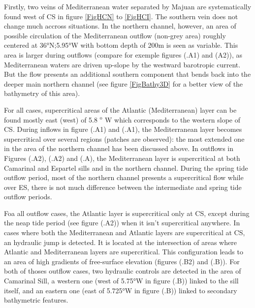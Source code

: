 Firstly, two veins of Mediterranean water separated by Majuan are systematically found west of CS in figure \ref{FigHCN} to \ref{FigHCI}.
The southern vein does not change much accross situations. In the northern channel, however, an area of possible circulation of the Mediterranean outflow (non-grey area) roughly centered at 36°N;5.95°W with bottom depth of 200m is seen as variable. This area is larger during outflows (compare for exemple figures (.A1) and (A2)), as Mediterranean waters are driven up-slope by the westward barotropic current. But the flow presents an additional southern component that bends back into the deeper main northern channel (see figure \ref{FigBathy3D} for a better view of the bathymetry of this area).

For all cases, supercritical areas of the Atlantic (Mediterranean) layer can be found mostly east (west) of 5.8 $^\text{o}$ W which corresponds to the western slope of CS. During inflows in figure (.A1) and (.A1), the Mediterranean layer becomes supercritical over several regions (patches are observed): the most extended one in the area of the northern channel has been discussed above. In outflows in Figures (.A2), (.A2) and (.A), the Mediterranean layer is supercritical at both Camarinal and Espartel sills and in the northern channel.  During the spring tide outflow period, most of the northern channel presents a supercritical flow while over ES, there is not much difference between the intermediate and spring tide outflow periods.

Foa all outflow cases, the Atlantic layer is supercritical only at CS, except during the neap tide period (see figure (.A2)) when it isn't supercritical anywhere. In cases where both the Mediterranean and Atlantic layers are supercritical at CS, an hydraulic jump is detected. It is located at the intersection of areas where Atlantic and Mediterranean layers are supercritical. This configuration leads to an area of high gradients of free-surface elevation (figures (.B2) and (.B)). For both of thoses outflow cases, two hydraulic controls are detected in the area of Camarinal Sill, a western one (west of 5.75°W in figure (.B)) linked to the sill itself, and an eastern one (east of 5.725°W in figure (.B)) linked to secondary bathymetric features.

